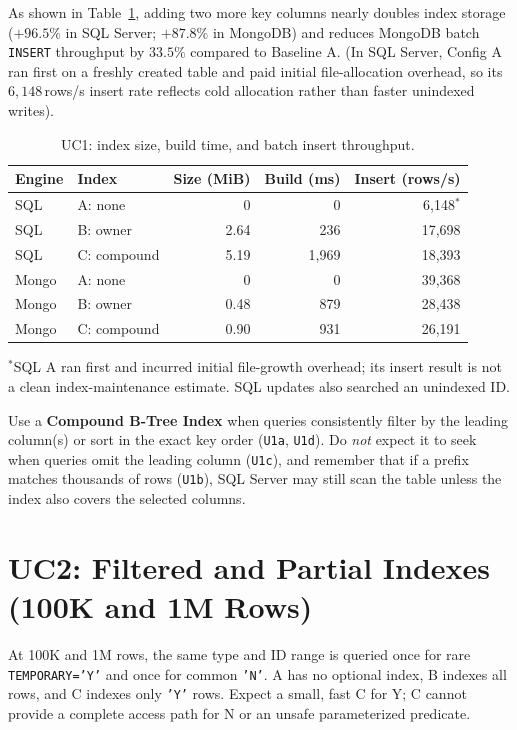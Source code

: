 As shown in Table~\ref{tab:uc1-tradeoff}, adding two more key columns nearly doubles index storage ($+96.5\%$ in SQL Server; $+87.8\%$ in MongoDB) and reduces MongoDB batch \texttt{INSERT} throughput by $33.5\%$ compared to Baseline A. (In SQL Server, Config A ran first on a freshly created table and paid initial file-allocation overhead, so its $6,148$\,rows/s insert rate reflects cold allocation rather than faster unindexed writes).

\begin{table}[H]
\centering\small
\caption{UC1: index size, build time, and batch insert throughput.}
\label{tab:uc1-tradeoff}
\begin{tabular}{@{}l l r r r@{}}
\toprule
Engine & Index & Size (MiB) & Build (ms) & Insert (rows/s)\\
\midrule
SQL & A: none & 0 & 0 & 6,148$^*$\\
SQL & B: owner & 2.64 & 236 & 17,698\\
SQL & C: compound & 5.19 & 1,969 & 18,393\\
\midrule
Mongo & A: none & 0 & 0 & 39,368\\
Mongo & B: owner & 0.48 & 879 & 28,438\\
Mongo & C: compound & 0.90 & 931 & 26,191\\
\bottomrule
\end{tabular}
\par\smallskip\scriptsize\raggedright $^*$SQL A ran first and incurred initial file-growth overhead; its insert result is not a clean index-maintenance estimate. SQL updates also searched an unindexed ID.\par
\end{table}

Use a \textbf{Compound B-Tree Index} when queries consistently filter by the leading column(s) or sort in the exact key order (\texttt{U1a}, \texttt{U1d}). Do \emph{not} expect it to seek when queries omit the leading column (\texttt{U1c}), and remember that if a prefix matches thousands of rows (\texttt{U1b}), SQL Server may still scan the table unless the index also covers the selected columns.

\FloatBarrier
\section{UC2: Filtered and Partial Indexes (100K and 1M Rows)}

At 100K and 1M rows, the same type and ID range is queried once for rare \texttt{TEMPORARY='Y'} and once for common \texttt{'N'}. A has no optional index, B indexes all rows, and C indexes only \texttt{'Y'} rows. Expect a small, fast C for Y; C cannot provide a complete access path for N or an unsafe parameterized predicate.

